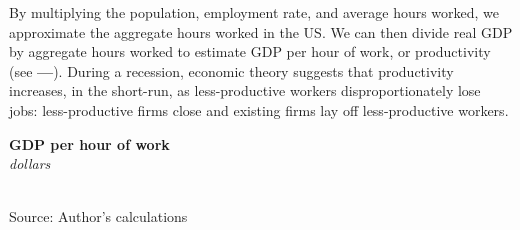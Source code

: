 \documentclass{report}
\makeatletter
\newcommand{\tbllink}[1]{\href{https://raw.githubusercontent.com/bdecon/US-chartbook/master/chartbook/data/#1}{\faTable}}
\newcommand*\short[1]{\expandafter\@gobbletwo\number\numexpr#1\relax}
\newcommand{\shdateaxisticks}{
		date coordinates in=x, axis line style={draw=none},
		xmax={2022-03-15},
		max space between ticks=40,	    
		xtick={{1990-01-01}, {1995-01-01}, {2000-01-01}, 
			{2005-01-01}, {2010-01-01}, {2015-01-01}, {2020-01-01}},
		minor xtick={},
		enlarge y limits={0.06}, enlarge x limits={0.01},
		}
\newcommand{\thickline}[4]{\addplot[ultra thick, no markers, color=#1] 
		table [x=#2, y=#3, col sep=comma] {#4};	}
\newcommand{\rbars}{
		\fill[color=black!10] (axis cs:{1990-07-01},\pgfkeysvalueof{/pgfplots/ymin}) rectangle 
			(axis cs:{1991-03-01}, \pgfkeysvalueof{/pgfplots/ymax});
		\fill[color=black!10] (axis cs:{2007-12-01},\pgfkeysvalueof{/pgfplots/ymin}) rectangle 
			(axis cs:{2009-07-01}, \pgfkeysvalueof{/pgfplots/ymax});
		\fill[color=black!10] (axis cs:{2001-03-01},\pgfkeysvalueof{/pgfplots/ymin}) rectangle 
			(axis cs:{2001-11-01}, \pgfkeysvalueof{/pgfplots/ymax});
		\fill[color=black!10] (axis cs:{2020-02-01},\pgfkeysvalueof{/pgfplots/ymin}) rectangle 
			(axis cs:{2020-05-01}, \pgfkeysvalueof{/pgfplots/ymax});}
\makeatother
\begin{document}
\vspace{4mm}

\begin{minipage}{0.76\textwidth}
\small By multiplying the population, employment rate, and average hours worked, we approximate the aggregate hours worked in the US. We can then divide real GDP by aggregate hours worked to estimate GDP per hour of work, or productivity (see {\color{cyan!60!white}\textbf{---}}). During a recession, economic theory suggests that productivity increases, in the short-run, as less-productive workers disproportionately lose jobs: less-productive firms close and existing firms lay off less-productive workers.
\end{minipage}

\begin{minipage}{0.3\textwidth}
\small 
\end{minipage}\hspace{8mm}
\begin{minipage}{0.405\textwidth}
\normalsize \textbf{GDP per hour of work}\\
\footnotesize{\textit{dollars}}\\
\hspace*{-2mm} \\
\footnotesize{Source: Author's calculations} \hfill \tbllink{gdpjobslvl.csv} 
\end{minipage}
\newpage
\hypertarget{oegr}{}
\end{document}
